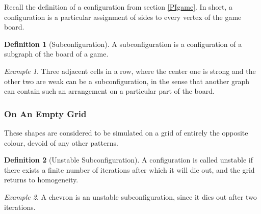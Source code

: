 \documentclass[12pt]{article}
\theoremstyle{definition}
\newtheorem{definition}{Definition}%
\theoremstyle{remark}
\theoremstyle{remark}
\newtheorem{example}{Example}%
\begin{document}
\par
Recall the definition of a configuration from section \ref{PIgame}. In short, a configuration is a particular assignment of sides to every vertex of the game board. 


\begin{definition}[Subconfiguration]
A subconfiguration is a configuration of a subgraph of the board of a game.
\end{definition}
\begin{example}
Three adjacent cells in a row, where the center one is strong and the other two are weak can be a subconfiguration, in the sense that another graph can contain such an arrangement on a particular part of the board.
\end{example}


\subsubsection{On An Empty Grid} \label{EmptyGrid}
\par
These shapes are considered to be simulated on a grid of entirely the opposite colour, devoid of any other patterns.

\begin{definition}[Unstable Subconfiguration]
A configuration is called unstable if there exists a finite number of iterations after which it will die out, and the grid returns to homogeneity. 
\end{definition}
\begin{example}
A chevron is an unstable subconfiguration, since it dies out after two iterations.


\end{example}
\end{document}
